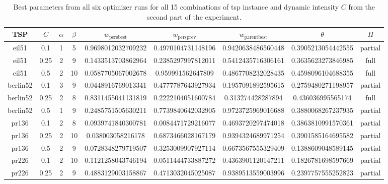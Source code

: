 \begin{table}[h]
	\centering
	\caption[Best parameters from all six optimizer runs for all 15 instance combinations]{Best parameters from all six optimizer runs for all 15 combinations of \gls{tsp} instance and dynamic intensity $C$ from the second part of the experiment.}
	\label{tab:best-parameters}
	\begin{tabular}{cc | ccccccc}
		\hline
		TSP & $C$ & $\alpha$ & $\beta$ & $w_{\text{persbest}}$ & $w_{\text{persprev}}$& $w_{\text{parentbest}}$ & $\theta$ & $H$ \\ \hline
		eil51 & 0.1 & 1 & 5 & \num{0.9698012032709232} & \num{0.4970104731148196} & \num{0.9420638486560448} & \num{0.3905213054442555} & partial \\ 
		eil51 & 0.25 & 2 & 9 & \num{0.1433513703862964} & \num{0.2385297997812011} & \num{0.5412435716306161} & \num{0.3635623273846985} & full \\ 
		eil51 & 0.5 & 2 & 10 & \num{0.0587705067002678} & \num{0.959991562647809} & \num{0.4867708232028435} & \num{0.4598096104688355} & full \\ 
		berlin52 & 0.1 & 3 & 9 & \num{0.0448916769013341} & \num{0.4777787643927934} & \num{0.1957091892595615} & \num{0.2759480271198957} & partial \\ 
		berlin52 & 0.25 & 2 & 8 & \num{0.8311455041131819} & \num{0.2222104051600784} & \num{0.313274428287894} & \num{0.436036995565174} & full \\ 
		berlin52 & 0.5 & 1 & 9 & \num{0.2485751505630211} & \num{0.7739840642032905} & \num{0.9723725969016688} & \num{0.3880068267237935} & partial \\ 
		pr136 & 0.1 & 2 & 8 & \num{0.0939741840300781} & \num{0.0084471729216077} & \num{0.4693720297474018} & \num{0.3863810991570361} & partial \\ 
		pr136 & 0.25 & 2 & 10 & \num{0.038003058216178} & \num{0.6873466028167179} & \num{0.9394324689971254} & \num{0.3901585164695582} & partial \\ 
		pr136 & 0.5 & 2 & 9 & \num{0.0728348279719507} & \num{0.3253009907927114} & \num{0.6673567555329409} & \num{0.1388609048589145} & partial \\ 
		pr226 & 0.1 & 2 & 10 & \num{0.1121258043746194} & \num{0.0511444733887272} & \num{0.4363901120147211} & \num{0.1826781698597669} & partial \\ 
		pr226 & 0.25 & 2 & 9 & \num{0.4883129003158867} & \num{0.4713032045025087} & \num{0.9389513559003996} & \num{0.2397757555252823} & partial \\ 

\end{tabular}
\end{table}
